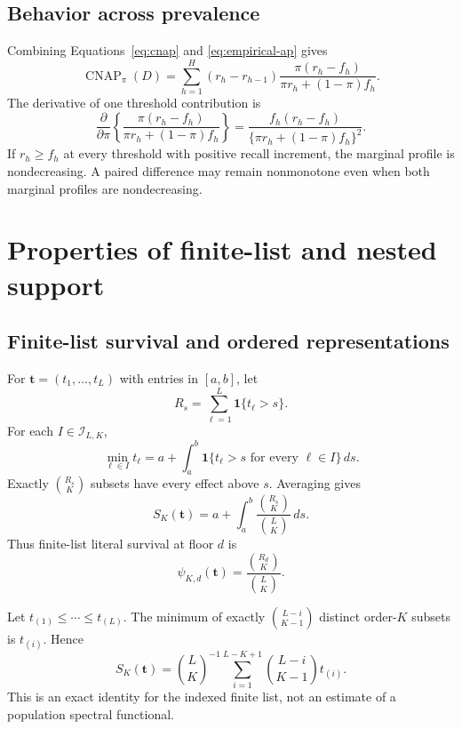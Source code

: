 \documentclass[11pt]{article}
\newcommand{\CNAP}{\operatorname{CNAP}}
\theoremstyle{remark}
\begin{document}
\subsection{Behavior across prevalence}

Combining Equations~\eqref{eq:cnap} and \eqref{eq:empirical-ap} gives
\begin{equation}
\CNAP_\pi(D)
=
\sum_{h=1}^H
(r_h-r_{h-1})
\frac{\pi(r_h-f_h)}
{\pi r_h+(1-\pi)f_h}.
\label{eq:cnap-profile}
\end{equation}
The derivative of one threshold contribution is
\begin{equation}
\frac{\partial}{\partial\pi}
\left\{
\frac{\pi(r_h-f_h)}
{\pi r_h+(1-\pi)f_h}
\right\}
=
\frac{f_h(r_h-f_h)}
{\{\pi r_h+(1-\pi)f_h\}^2}.
\label{eq:cnap-derivative}
\end{equation}
If $r_h\geq f_h$ at every threshold with positive recall increment, the
marginal profile is nondecreasing. A paired difference may remain nonmonotone
even when both marginal profiles are nondecreasing.


\section{Properties of finite-list and nested support}
\label{app:support-proofs}

\subsection{Finite-list survival and ordered representations}

For $\mathbf t=(t_1,\ldots,t_L)$ with entries in $[a,b]$, let
\[
R_s=\sum_{\ell=1}^L\mathbf 1\{t_\ell>s\}.
\]
For each $I\in\mathcal I_{L,K}$,
\[
\min_{\ell\in I}t_\ell
=
a+\int_a^b
\mathbf 1\{t_\ell>s\text{ for every }\ell\in I\}\,ds.
\]
Exactly $\binom{R_s}{K}$ subsets have every effect above $s$. Averaging gives
\begin{equation}
S_K(\mathbf t)
=
a+\int_a^b
\frac{\binom{R_s}{K}}{\binom{L}{K}}\,ds.
\label{eq:finite-survival}
\end{equation}
Thus finite-list literal survival at floor $d$ is
\begin{equation}
\psi_{K,d}(\mathbf t)
=
\frac{\binom{R_d}{K}}{\binom{L}{K}}.
\label{eq:finite-literal}
\end{equation}

Let $t_{(1)}\leq\cdots\leq t_{(L)}$. The minimum of exactly
$\binom{L-i}{K-1}$ distinct order-$K$ subsets is $t_{(i)}$. Hence
\begin{equation}
S_K(\mathbf t)
=
\binom{L}{K}^{-1}
\sum_{i=1}^{L-K+1}
\binom{L-i}{K-1}t_{(i)}.
\label{eq:finite-ordered}
\end{equation}
This is an exact identity for the indexed finite list, not an estimate of a
population spectral functional.
\end{document}
